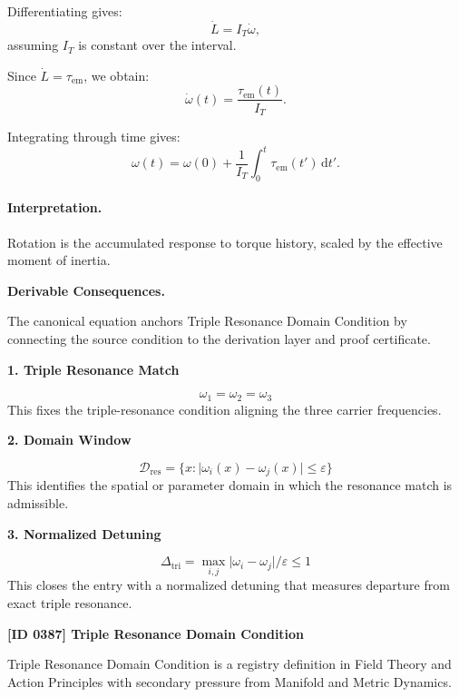 Differentiating gives:
\begin{equation}
\dot{L}
=
I_T\dot{\omega},
\end{equation}
assuming $I_T$ is constant over the interval.

Since $\dot{L}=\tau_{\mathrm{em}}$, we obtain:
\begin{equation}
\dot{\omega}(t)
=
\frac{\tau_{\mathrm{em}}(t)}{I_T}.
\end{equation}

Integrating through time gives:
\begin{equation}
\boxed{
\omega(t)
=
\omega(0)
+
\frac{1}{I_T}
\int_0^t
\tau_{\mathrm{em}}(t')
\,\mathrm{d}t' .
}
\end{equation}

\paragraph{Interpretation.}
Rotation is the accumulated response to torque history, scaled by the effective moment of inertia.

\par\vspace{0.35em}
\noindent\textbf{Derivable Consequences.}\quad
\begingroup
\footnotesize
\raggedright
The canonical equation anchors Triple Resonance Domain Condition by connecting the source condition to the derivation layer and proof certificate.
\par\endgroup

\noindent\textbf{1. Triple Resonance Match}\par
\[
\omega_{1}=\omega_{2}=\omega_{3}
\]
\noindent This fixes the triple-resonance condition aligning the three carrier frequencies.\par
\noindent\textbf{2. Domain Window}\par
\[
\mathcal{D}_{\mathrm{res}}=\{x:\lvert\omega_i(x)-\omega_j(x)\rvert\leq\varepsilon\}
\]
\noindent This identifies the spatial or parameter domain in which the resonance match is admissible.\par
\noindent\textbf{3. Normalized Detuning}\par
\[
\Delta_{\mathrm{tri}}=\max_{i,j}\lvert\omega_i-\omega_j\rvert/\varepsilon\leq1
\]
\noindent This closes the entry with a normalized detuning that measures departure from exact triple resonance.\par

\clearpage
\noindent\textbf{[ID 0387] Triple Resonance Domain Condition}\par
\vspace{0.35em}
\begingroup\small
{}
Triple Resonance Domain Condition is a registry definition in Field Theory and Action Principles with secondary pressure from Manifold and Metric Dynamics.

